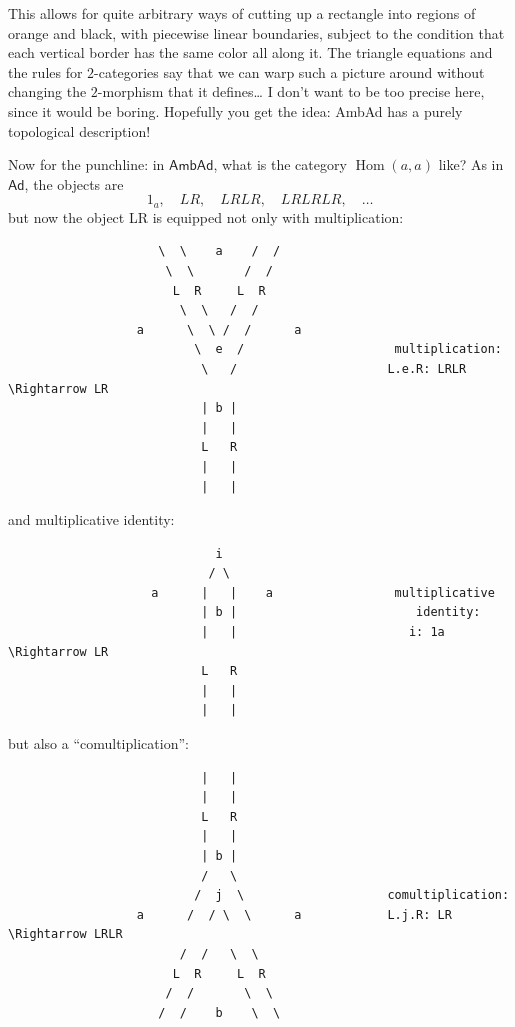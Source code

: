 \documentclass{article}
\begin{document}
This allows for quite arbitrary ways of cutting up a rectangle into
regions of orange and black, with piecewise linear boundaries, subject
to the condition that each vertical border has the same color all along
it. The triangle equations and the rules for \(2\)-categories say that
we can warp such a picture around without changing the \(2\)-morphism
that it defines\ldots{} I don't want to be too precise here, since it
would be boring. Hopefully you get the idea: AmbAd has a purely
topological description!

Now for the punchline: in \(\mathsf{AmbAd}\), what is the category
\(\operatorname{Hom}(a,a)\) like? As in \(\mathsf{Ad}\), the objects are
\[1_a,\quad LR,\quad LRLR,\quad LRLRLR,\quad \ldots\] but now the object
LR is equipped not only with multiplication:

\begin{verbatim}
                     \  \    a    /  /  
                      \  \       /  /
                       L  R     L  R
                        \  \   /  /
                  a      \  \ /  /      a      
                          \  e  /                     multiplication:
                           \   /                     L.e.R: LRLR \Rightarrow LR 
                           | b |
                           |   |
                           L   R
                           |   |
                           |   |   
\end{verbatim}

and multiplicative identity:

\begin{verbatim}
                             i
                            / \
                    a      |   |    a                 multiplicative
                           | b |                         identity:
                           |   |                        i: 1a \Rightarrow LR
                           L   R   
                           |   |
                           |   |
\end{verbatim}

but also a ``comultiplication'':

\begin{verbatim}
                           |   |
                           |   |   
                           L   R
                           |   |
                           | b |
                           /   \                           
                          /  j  \                    comultiplication:
                  a      /  / \  \      a            L.j.R: LR \Rightarrow LRLR
                        /  /   \  \
                       L  R     L  R
                      /  /       \  \
                     /  /    b    \  \ 
\end{verbatim}
\end{document}

